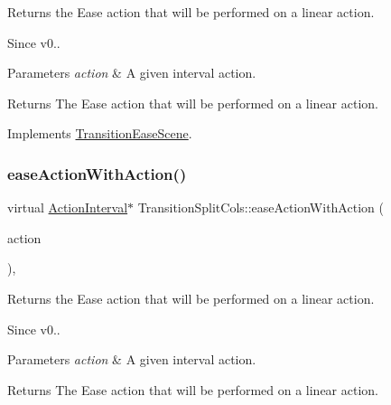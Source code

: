 Returns the Ease action that will be performed on a linear action. \begin{DoxySince}{Since}
v0..
\end{DoxySince}

\begin{DoxyParams}{Parameters}
{\em action} & A given interval action. \\
\hline
\end{DoxyParams}
\begin{DoxyReturn}{Returns}
The Ease action that will be performed on a linear action. 
\end{DoxyReturn}


Implements \hyperlink{classTransitionEaseScene_a6f27540600b0d703ed30adc8976e65df}{Transition\+Ease\+Scene}.

\mbox{\label{classTransitionSplitCols_a4e9f0eafce932c38cb22e5551f487661}} 
\subsubsection{\texorpdfstring{ease\+Action\+With\+Action()}{easeActionWithAction()}\hspace{0.1cm}{\footnotesize\ttfamily [2/2]}}
{\footnotesize\ttfamily virtual \hyperlink{classActionInterval}{Action\+Interval}$\ast$ Transition\+Split\+Cols\+::ease\+Action\+With\+Action (\begin{DoxyParamCaption}\item[{\hyperlink{classActionInterval}{Action\+Interval} $\ast$}]{action }\end{DoxyParamCaption})\hspace{0.3cm}{\ttfamily [override]}, {\ttfamily [virtual]}}

Returns the Ease action that will be performed on a linear action. \begin{DoxySince}{Since}
v0..
\end{DoxySince}

\begin{DoxyParams}{Parameters}
{\em action} & A given interval action. \\
\hline
\end{DoxyParams}
\begin{DoxyReturn}{Returns}
The Ease action that will be performed on a linear action. 
\end{DoxyReturn}


